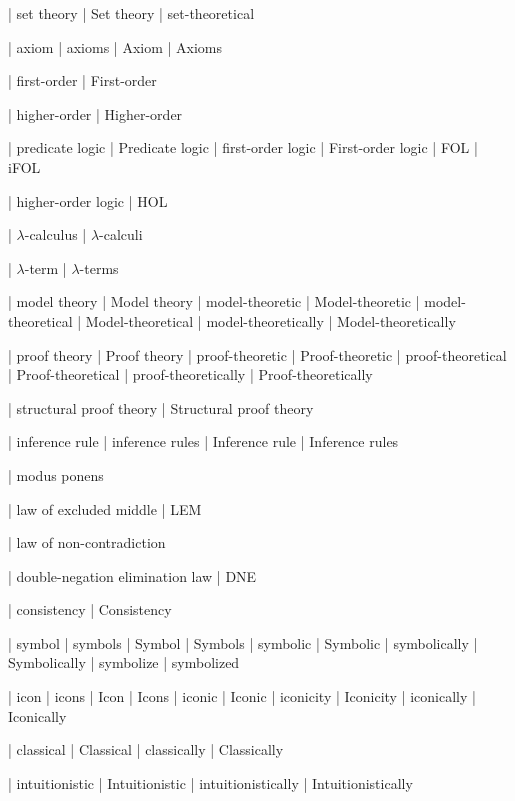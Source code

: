  | set theory
 | Set theory
 | set-theoretical

 | axiom
 | axioms
 | Axiom
 | Axioms

 | first-order
 | First-order

 | higher-order
 | Higher-order

 | predicate logic
 | Predicate logic
 | first-order logic
 | First-order logic
 | FOL
 | iFOL
 
 | higher-order logic
 | HOL

 | $\lambda$-calculus
 | $\lambda$-calculi
 
 | $\lambda$-term
 | $\lambda$-terms

 | model theory
 | Model theory
 | model-theoretic
 | Model-theoretic
 | model-theoretical
 | Model-theoretical
 | model-theoretically
 | Model-theoretically

 | proof theory
 | Proof theory
 | proof-theoretic
 | Proof-theoretic
 | proof-theoretical
 | Proof-theoretical
 | proof-theoretically
 | Proof-theoretically

 | structural proof theory
 | Structural proof theory

 | inference rule
 | inference rules
 | Inference rule
 | Inference rules

 | modus ponens

 | law of excluded middle
 | LEM

 | law of non-contradiction

 | double-negation elimination law
 | DNE

 | consistency
 | Consistency

 | symbol
 | symbols
 | Symbol
 | Symbols
 | symbolic
 | Symbolic
 | symbolically
 | Symbolically
 | symbolize
 | symbolized

 | icon
 | icons
 | Icon
 | Icons
 | iconic
 | Iconic
 | iconicity
 | Iconicity
 | iconically
 | Iconically
 
 | classical
 | Classical
 | classically
 | Classically

 | intuitionistic
 | Intuitionistic
 | intuitionistically
 | Intuitionistically

